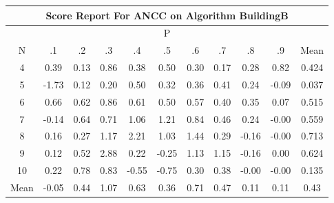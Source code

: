 \documentclass[11pt,a4paper]{report}
\begin{document}
\begin{longtable}{ | c || c | c | c | c | c | c | c | c | c || c |}
\hline
\multicolumn{11}{|c|}{ Score Report For ANCC on Algorithm BuildingB} \\
\hline
\multicolumn{11}{|c|}{ P } \\
\hline
N & .1 & .2 & .3 & .4 & .5 & .6 & .7 & .8 & .9 & Mean\\
 \hline
 \hline
 \endhead
  4 &  \cellcolor[HTML]{F7F7FF} 0.39 &  \cellcolor[HTML]{FFFFFF} 0.13 &  \cellcolor[HTML]{E7E7FF} 0.86 &  \cellcolor[HTML]{F7F7FF} 0.38 &  \cellcolor[HTML]{EFEFFF} 0.50 &  \cellcolor[HTML]{F7F7FF} 0.30 &  \cellcolor[HTML]{F7F7FF} 0.17 &  \cellcolor[HTML]{F7F7FF} 0.28 &  \cellcolor[HTML]{E7E7FF} 0.82 & 0.424 \\
  5 &  \cellcolor[HTML]{FFD7D7} -1.73 &  \cellcolor[HTML]{FFFFFF} 0.12 &  \cellcolor[HTML]{F7F7FF} 0.20 &  \cellcolor[HTML]{EFEFFF} 0.50 &  \cellcolor[HTML]{F7F7FF} 0.32 &  \cellcolor[HTML]{F7F7FF} 0.36 &  \cellcolor[HTML]{F7F7FF} 0.41 &  \cellcolor[HTML]{F7F7FF} 0.24 &  \cellcolor[HTML]{FFFFFF} -0.09 & 0.037 \\
  6 &  \cellcolor[HTML]{EFEFFF} 0.66 &  \cellcolor[HTML]{EFEFFF} 0.62 &  \cellcolor[HTML]{E7E7FF} 0.86 &  \cellcolor[HTML]{EFEFFF} 0.61 &  \cellcolor[HTML]{EFEFFF} 0.50 &  \cellcolor[HTML]{EFEFFF} 0.57 &  \cellcolor[HTML]{F7F7FF} 0.40 &  \cellcolor[HTML]{F7F7FF} 0.35 &  \cellcolor[HTML]{FFFFFF} 0.07 & 0.515 \\
  7 &  \cellcolor[HTML]{FFFFFF} -0.14 &  \cellcolor[HTML]{EFEFFF} 0.64 &  \cellcolor[HTML]{EFEFFF} 0.71 &  \cellcolor[HTML]{E7E7FF} 1.06 &  \cellcolor[HTML]{DFDFFF} 1.21 &  \cellcolor[HTML]{E7E7FF} 0.84 &  \cellcolor[HTML]{F7F7FF} 0.46 &  \cellcolor[HTML]{F7F7FF} 0.24 &  \cellcolor[HTML]{FFFFFF} -0.00 & 0.559 \\
  8 &  \cellcolor[HTML]{FFFFFF} 0.16 &  \cellcolor[HTML]{F7F7FF} 0.27 &  \cellcolor[HTML]{DFDFFF} 1.17 &  \cellcolor[HTML]{C7C7FF} 2.21 &  \cellcolor[HTML]{E7E7FF} 1.03 &  \cellcolor[HTML]{D7D7FF} 1.44 &  \cellcolor[HTML]{F7F7FF} 0.29 &  \cellcolor[HTML]{FFF7F7} -0.16 &  \cellcolor[HTML]{FFFFFF} -0.00 & 0.713 \\
  9 &  \cellcolor[HTML]{FFFFFF} 0.12 &  \cellcolor[HTML]{EFEFFF} 0.52 &  \cellcolor[HTML]{B7B7FF} 2.88 &  \cellcolor[HTML]{F7F7FF} 0.22 &  \cellcolor[HTML]{FFF7F7} -0.25 &  \cellcolor[HTML]{DFDFFF} 1.13 &  \cellcolor[HTML]{DFDFFF} 1.15 &  \cellcolor[HTML]{FFFFFF} -0.16 &  \cellcolor[HTML]{FFFFFF} 0.00 & 0.624 \\
  10 &  \cellcolor[HTML]{F7F7FF} 0.22 &  \cellcolor[HTML]{EFEFFF} 0.78 &  \cellcolor[HTML]{E7E7FF} 0.83 &  \cellcolor[HTML]{FFEFEF} -0.55 &  \cellcolor[HTML]{FFEFEF} -0.75 &  \cellcolor[HTML]{F7F7FF} 0.30 &  \cellcolor[HTML]{F7F7FF} 0.38 &  \cellcolor[HTML]{FFFFFF} -0.00 &  \cellcolor[HTML]{FFFFFF} -0.00 & 0.135 \\
 \hline
 \hline
Mean &  \cellcolor[HTML]{FFFFFF} -0.05 &  \cellcolor[HTML]{F7F7FF} 0.44 &  \cellcolor[HTML]{E7E7FF} 1.07 &  \cellcolor[HTML]{EFEFFF} 0.63 &  \cellcolor[HTML]{F7F7FF} 0.36 &  \cellcolor[HTML]{EFEFFF} 0.71 &  \cellcolor[HTML]{F7F7FF} 0.47 &  \cellcolor[HTML]{FFFFFF} 0.11 &  \cellcolor[HTML]{FFFFFF} 0.11 &  \cellcolor[HTML]{F7F7FF} 0.43
\end{longtable}
\end{document}
